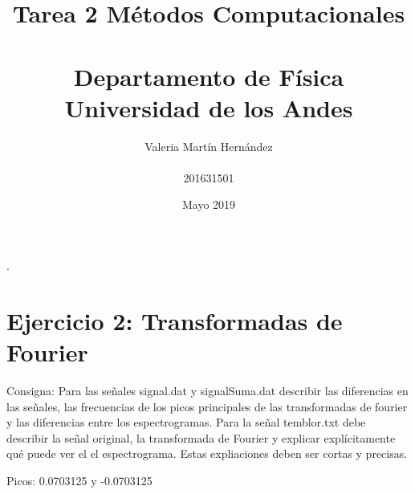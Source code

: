 \documentclass[11pt,letterpaper]{exam}
\title{Tarea 2 Métodos Computacionales\\\\ Departamento de Física \\ Universidad de los Andes}
\author{Valeria Martín Hernández\\\\201631501}
\date{Mayo 2019}
\begin{document}
\maketitle
.\newline\newline\newline\newline\newline\newline\newline\newline\newline\newline\newline\newline\newline\newline\newline\newline\newline\newline\newline\newline\newline\newline\newline\newline\newline\newline

\maketitle

\section{Ejercicio 2: Transformadas de Fourier}
Consigna:
Para las señales signal.dat y signalSuma.dat describir las diferencias en las señales, las frecuencias de
los picos principales de las transformadas de fourier y las diferencias entre los espectrogramas.
Para la señal temblor.txt debe describir la señal original, la transformada de Fourier y explicar
explícitamente qué puede ver el el espectrograma.
Estas expliaciones deben ser cortas y precisas.

Picos: 0.0703125 y -0.0703125
\end{document}

